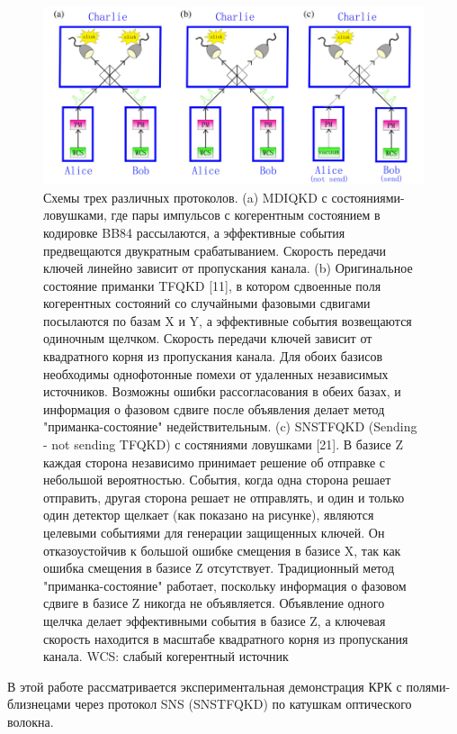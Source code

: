 \begin{figure}
    \centering
    \includegraphics[width=\textwidth]{images/TF schemes lit.jpg}
    \caption{Схемы трех различных протоколов. (a) MDIQKD с состояниями-ловушками, где пары импульсов с когерентным состоянием в кодировке BB84 рассылаются, а эффективные события предвещаются двукратным срабатыванием. Скорость передачи ключей линейно зависит от пропускания канала. (b) Оригинальное состояние приманки TFQKD [11], в котором сдвоенные поля когерентных состояний со случайными фазовыми сдвигами посылаются по базам X и Y, а эффективные события возвещаются одиночным щелчком. Скорость передачи ключей зависит от квадратного корня из пропускания канала. Для обоих базисов необходимы однофотонные помехи от удаленных независимых источников. Возможны ошибки рассогласования в обеих базах, и информация о фазовом сдвиге после объявления делает метод "приманка-состояние" недействительным. (c) SNSTFQKD (Sending - not sending TFQKD) с состяниями ловушками [21]. В базисе Z каждая сторона независимо принимает решение об отправке с небольшой вероятностью. События, когда одна сторона решает отправить, другая сторона решает не отправлять, и один и только один детектор щелкает (как показано на рисунке), являются целевыми событиями для генерации защищенных ключей. Он отказоустойчив к большой ошибке смещения в базисе X, так как ошибка смещения в базисе Z отсутствует. Традиционный метод "приманка-состояние" работает, поскольку информация о фазовом сдвиге в базисе Z никогда не объявляется. Объявление одного щелчка делает эффективными события в базисе Z, а ключевая скорость находится в масштабе квадратного корня из пропускания канала. WCS: слабый когерентный источник}
    \label{fig:TF protocols scheme}
\end{figure}
В этой работе рассматривается экспериментальная демонстрация КРК с полями-близнецами через протокол SNS (SNSTFQKD) по катушкам оптического волокна.
